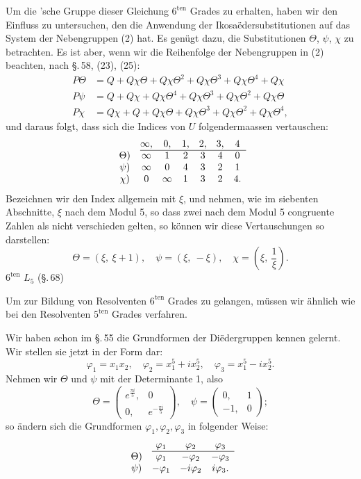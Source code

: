 Um die 'sche Gruppe dieser Gleichung $6^{\mathrm{ten}}$ Grades zu erhalten, haben wir den Einfluss zu untersuchen, den die Anwendung der Ikosa\"edersubstitutionen auf das System der Nebengruppen (2) hat. Es gen\"ugt dazu, die Substitutionen $\Theta$, $\psi$, $\chi$ zu betrachten. Es ist aber, wenn wir die Reihenfolge der Nebengruppen in (2) beachten, nach \S.\,58, (23), (25):
\[
\begin{aligned}
P\Theta &= Q + Q\chi\Theta + Q\chi\Theta^2 + Q\chi\Theta^3 + Q\chi\Theta^4 + Q\chi \\
P\psi &= Q + Q\chi + Q\chi\Theta^4 + Q\chi\Theta^3 + Q\chi\Theta^2 + Q\chi\Theta \\
P\chi &= Q\chi + Q + Q\chi\Theta + Q\chi\Theta^3 + Q\chi\Theta^2 + Q\chi\Theta^4,
\end{aligned}
\]
und daraus folgt, dass sich die Indices von $U$ folgendermaassen vertauschen:
\[
\begin{array}{c@{\quad}cccccc}
 & \infty, & 0, & 1, & 2, & 3, & 4 \\
\cline{2-7}
\Theta) & \infty & 1 & 2 & 3 & 4 & 0 \\
\psi) & \infty & 0 & 4 & 3 & 2 & 1 \\
\chi) & 0 & \infty & 1 & 3 & 2 & 4.
\end{array}
\]
Bezeichnen wir den Index allgemein mit $\xi$, und nehmen, wie im siebenten Abschnitte, $\xi$ nach dem Modul 5, so dass zwei nach dem Modul 5 congruente Zahlen als nicht verschieden gelten, so k\"onnen wir diese Vertauschungen so darstellen:
\[
\Theta = (\xi,\ \xi+1),\quad \psi = (\xi,\ -\xi),\quad \chi = \left(\xi,\ \frac{1}{\xi}\right)\!.
\]
 $6^{\mathrm{ten}}$  $L_5$ (\S.\,68) 

Um zur Bildung von Resolventen $6^{\mathrm{ten}}$ Grades zu gelangen, m\"ussen wir \"ahnlich wie bei den Resolventen $5^{\mathrm{ten}}$ Grades verfahren.

Wir haben schon im \S.\,55 die Grundformen der Di\"edergruppen kennen gelernt. Wir stellen sie jetzt in der Form dar:
\[
\varphi_1 = x_1x_2,\quad \varphi_2 = x_1^5+ix_2^5,\quad \varphi_3 = x_1^5-ix_2^5.
\]
Nehmen wir $\Theta$ und $\psi$ mit der Determinante 1, also
\[
\Theta = \begin{pmatrix} e^{\frac{\pi i}{5}}, & 0 \\ 0, & e^{-\frac{\pi i}{5}} \end{pmatrix},\quad \psi = \begin{pmatrix} 0, & 1 \\ -1, & 0 \end{pmatrix};
\]
so \"andern sich die Grundformen $\varphi_1, \varphi_2, \varphi_3$ in folgender Weise:
\[
\begin{array}{c@{\quad}ccc}
 & \varphi_1 & \varphi_2 & \varphi_3 \\
\cline{2-4}
\Theta) & \varphi_1 & -\varphi_2 & -\varphi_3 \\
\psi) & -\varphi_1 & -i\varphi_2 & i\varphi_3.
\end{array}
\]
